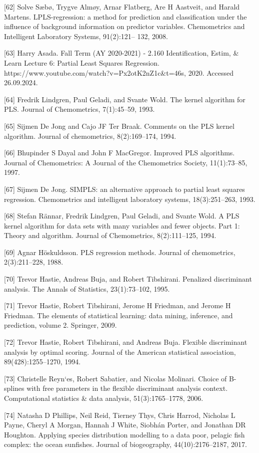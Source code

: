 \documentclass[preprint,12pt]{elsarticle}
\begin{document}
[62] Solve Sæbø, Trygve Almøy, Arnar Flatberg, Are H Aastveit, and Harald Martens. LPLS-regression: a method for prediction and classification under the influence of background information on predictor variables. Chemometrics and Intelligent Laboratory Systems, 91(2):121– 132, 2008. 

[63] Harry Asada. Fall Term (AY 2020-2021) - 2.160 Identification, Estim, & Learn Lecture 6: Partial Least Squares Regression. https://www.youtube.com/watch?v=Px2otK2nZ1c&t=46s, 2020. Accessed 26.09.2024. 

[64] Fredrik Lindgren, Paul Geladi, and Svante Wold. The kernel algorithm for PLS. Journal of Chemometrics, 7(1):45–59, 1993. 

[65] Sijmen De Jong and Cajo JF Ter Braak. Comments on the PLS kernel algorithm. Journal of chemometrics, 8(2):169–174, 1994. 

[66] Bhupinder S Dayal and John F MacGregor. Improved PLS algorithms. Journal of Chemometrics: A Journal of the Chemometrics Society, 11(1):73–85, 1997. 

[67] Sijmen De Jong. SIMPLS: an alternative approach to partial least squares regression. Chemometrics and intelligent laboratory systems, 18(3):251–263, 1993. 

[68] Stefan Rännar, Fredrik Lindgren, Paul Geladi, and Svante Wold. A PLS kernel algorithm for data sets with many variables and fewer objects. Part 1: Theory and algorithm. Journal of Chemometrics, 8(2):111–125, 1994. 

[69] Agnar Höskuldsson. PLS regression methods. Journal of chemometrics, 2(3):211–228, 1988. 

[70] Trevor Hastie, Andreas Buja, and Robert Tibshirani. Penalized discriminant analysis. The Annals of Statistics, 23(1):73–102, 1995. 

[71] Trevor Hastie, Robert Tibshirani, Jerome H Friedman, and Jerome H Friedman. The elements of statistical learning: data mining, inference, and prediction, volume 2. Springer, 2009. 

[72] Trevor Hastie, Robert Tibshirani, and Andreas Buja. Flexible discriminant analysis by optimal scoring. Journal of the American statistical association, 89(428):1255–1270, 1994. 

[73] Christelle Reyn`es, Robert Sabatier, and Nicolas Molinari. Choice of B-splines with free parameters in the flexible discriminant analysis context. Computational statistics & data analysis, 51(3):1765–1778, 2006. 

[74] Natasha D Phillips, Neil Reid, Tierney Thys, Chris Harrod, Nicholas L Payne, Cheryl A Morgan, Hannah J White, Siobhán Porter, and Jonathan DR Houghton. Applying species distribution modelling to a data poor, pelagic fish complex: the ocean sunfishes. Journal of biogeography, 44(10):2176–2187, 2017. 
\end{document}

